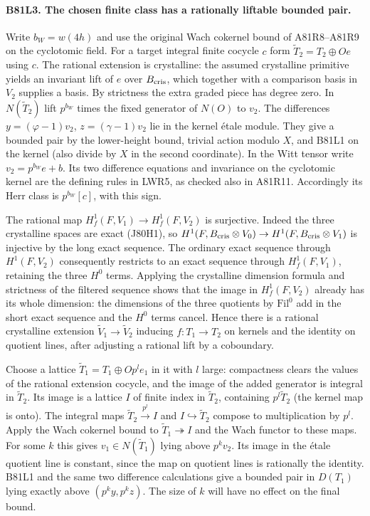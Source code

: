 \paragraph{B81L3. The chosen finite class has a rationally liftable bounded pair.}
Write $b_W=w(4h)$ and use the original Wach cokernel bound of
A81R8--A81R9 on the cyclotomic field. For a target integral
finite cocycle $c$ form $\widetilde T_2=T_2\oplus Oe$ using $c$.
The rational extension is crystalline: the assumed crystalline
primitive yields an invariant lift of $e$ over $B_{\rm cris}$,
which together with a comparison basis in $V_2$ supplies a basis.
By strictness the extra graded piece has degree zero. In
$N(\widetilde T_2)$ lift $p^{b_W}$ times the fixed generator of
$N(O)$ to $v_2$. The differences
$y=(\varphi-1)v_2$, $z=(\gamma-1)v_2$ lie in the kernel \'etale
module. They give a bounded pair by the lower-height bound, trivial
action modulo $X$, and B81L1 on the kernel (also divide by $X$ in
the second coordinate). In the Witt tensor write $v_2=p^{b_W}e+b$.
Its two difference equations and invariance on the cyclotomic kernel
are the defining rules in LWR5, as checked also in A81R11. Accordingly its Herr class is
$p^{b_W}[c]$, with this sign.

The rational map $H^1_f(F,V_1)\to H^1_f(F,V_2)$ is surjective.
Indeed the three crystalline spaces are exact (J80H1), so
$H^1(F,B_{\rm cris}\otimes V_0)\to H^1(F,B_{\rm cris}\otimes V_1)$
is injective by the long exact sequence. The ordinary exact
sequence through $H^1(F,V_2)$ consequently restricts to an exact
sequence through $H_f^1(F,V_1)$, retaining the three $H^0$ terms.
Applying the crystalline dimension formula and strictness of the
filtered sequence shows that the image in $H_f^1(F,V_2)$ already
has its whole dimension: the dimensions of the three quotients
by $\mathrm{Fil}^0$ add in the short exact sequence and the $H^0$
terms cancel. Hence there is a rational crystalline extension
$\widetilde V_1\to\widetilde V_2$ inducing $f:T_1\to T_2$ on
kernels and the identity on quotient lines, after adjusting a
rational lift by a coboundary.

Choose a lattice $\widetilde T_1=T_1\oplus O p^l e_1$ in it with
$l$ large: compactness clears the values of the rational extension
cocycle, and the image of the added generator is integral in
$\widetilde T_2$. Its image is a lattice $I$ of finite index in
$\widetilde T_2$, containing $p^l\widetilde T_2$ (the kernel map
is onto). The integral maps $\widetilde T_2\xrightarrow{p^l}I$
and $I\hookrightarrow\widetilde T_2$ compose to multiplication
by $p^l$. Apply the Wach cokernel bound to
$\widetilde T_1\twoheadrightarrow I$ and the Wach functor to these
maps. For some $k$ this gives $v_1\in N(\widetilde T_1)$ lying
above $p^k v_2$. Its image in the \'etale quotient line is constant,
since the map on quotient lines is rationally the identity.
B81L1 and the same two difference calculations give a bounded
pair in $D(T_1)$ lying exactly above $(p^k y,p^k z)$. The size
of $k$ will have no effect on the final bound.

